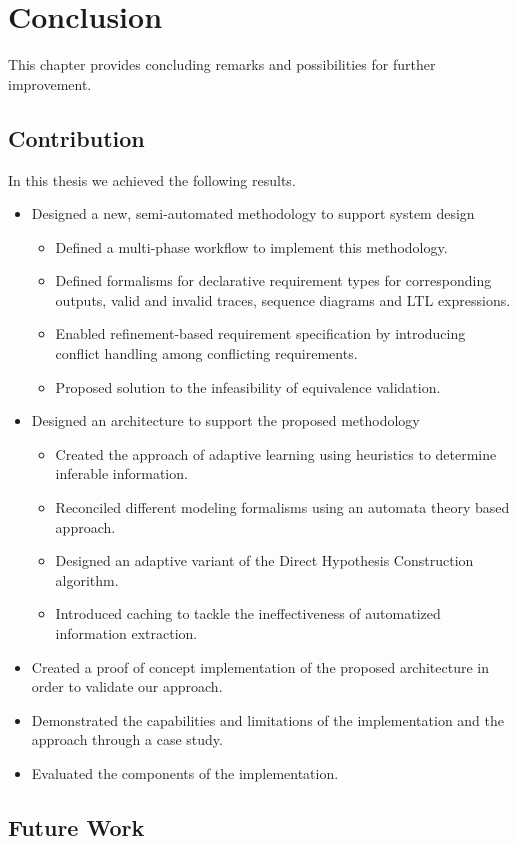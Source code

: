 \chapter{Conclusion} \label{conclusion}
This chapter provides concluding remarks and possibilities for further improvement.

\section{Contribution}

In this thesis we achieved the following results.

\begin{itemize}
	\item Designed a new, semi-automated methodology to support system design
	\begin{itemize}
		\item Defined a multi-phase workflow to implement this methodology.
		\item Defined formalisms for declarative requirement types for corresponding outputs, valid and invalid traces, sequence diagrams and LTL expressions.
		\item Enabled refinement-based requirement specification by introducing conflict handling among conflicting requirements.
		\item Proposed solution to the infeasibility of equivalence validation.
	\end{itemize}
	\item Designed an architecture to support the proposed methodology
	\begin{itemize}
		\item Created the approach of adaptive learning using heuristics to determine inferable information.
		\item Reconciled different modeling formalisms using an automata theory based approach.
		\item Designed an adaptive variant of the Direct Hypothesis Construction algorithm.
		\item Introduced caching to tackle the ineffectiveness of automatized information extraction.
	\end{itemize}
	\item Created a proof of concept implementation of the proposed architecture in order to validate our approach.
	\item Demonstrated the capabilities and limitations of the implementation and the approach through a case study.
	\item Evaluated the components of the implementation.
\end{itemize}
\clearpage
\section{Future Work}
